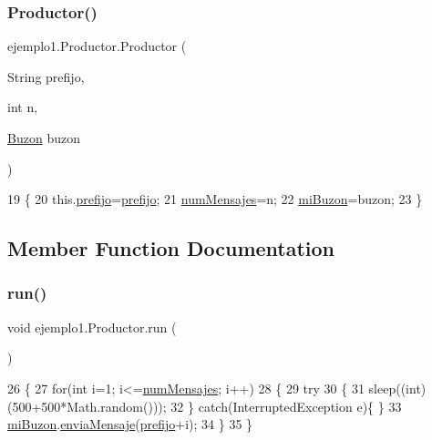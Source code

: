 \subsubsection{\texorpdfstring{Productor()}{Productor()}}
{\footnotesize\ttfamily ejemplo1.\+Productor.\+Productor (\begin{DoxyParamCaption}\item[{String}]{prefijo,  }\item[{int}]{n,  }\item[{\mbox{\hyperlink{classejemplo1_1_1_buzon}{Buzon}}}]{buzon }\end{DoxyParamCaption})\hspace{0.3cm}{\ttfamily [inline]}}


\begin{DoxyCode}
19     \{
20         this.\mbox{\hyperlink{classejemplo1_1_1_productor_a205e5e4e819a322d2017fd816ac94d2d}{prefijo}}=\mbox{\hyperlink{classejemplo1_1_1_productor_a205e5e4e819a322d2017fd816ac94d2d}{prefijo}};
21         \mbox{\hyperlink{classejemplo1_1_1_productor_a6be9757fc794b9da3639d7f4f1acef1a}{numMensajes}}=n;
22         \mbox{\hyperlink{classejemplo1_1_1_productor_a92dfbce31b3fc0ff14d36d51ba0619bd}{miBuzon}}=buzon;
23     \}
\end{DoxyCode}


\subsection{Member Function Documentation}
\mbox{\label{classejemplo1_1_1_productor_a813cc92fe486532214ebe9b626a39cd5}} 
\subsubsection{\texorpdfstring{run()}{run()}}
{\footnotesize\ttfamily void ejemplo1.\+Productor.\+run (\begin{DoxyParamCaption}{ }\end{DoxyParamCaption})\hspace{0.3cm}{\ttfamily [inline]}}


\begin{DoxyCode}
26     \{
27         \textcolor{keywordflow}{for}(\textcolor{keywordtype}{int} i=1; i<=\mbox{\hyperlink{classejemplo1_1_1_productor_a6be9757fc794b9da3639d7f4f1acef1a}{numMensajes}}; i++)
28         \{
29             \textcolor{keywordflow}{try}
30             \{
31                 sleep((\textcolor{keywordtype}{int})(500+500*Math.random()));
32             \} \textcolor{keywordflow}{catch}(InterruptedException e)\{  \}
33             \mbox{\hyperlink{classejemplo1_1_1_productor_a92dfbce31b3fc0ff14d36d51ba0619bd}{miBuzon}}.\mbox{\hyperlink{classejemplo1_1_1_buzon_a0d9762b5773778ad0c357001bfd17393}{enviaMensaje}}(\mbox{\hyperlink{classejemplo1_1_1_productor_a205e5e4e819a322d2017fd816ac94d2d}{prefijo}}+i);
34         \}
35     \}
\end{DoxyCode}


